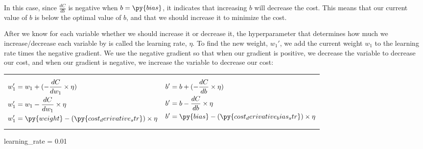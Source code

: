 \documentclass[12pt]{article}
\begin{document}
In this case, since $\frac{dC}{db}$ is negative when $b = \py{bias}$, it indicates that increasing $b$ will decrease the cost. This means that our current value of $b$ is below the optimal value of $b$, and that we should increase it to minimize the cost.

After we know for each variable whether we should increase it or decrease it, the hyperparameter that determines how much we increase/decrease each variable by is called the learning rate, $\eta$. To find the new weight, $w_1'$, we add the current weight $w_1$ to the learning rate times the negative gradient. We use the negative gradient so that when our gradient is positive, we decrease the variable to decrease our cost, and when our gradient is negative, we increase the variable to decrease our cost:
{
\setlength{\abovedisplayskip}{0pt}
\setlength{\belowdisplayskip}{0pt}
\begin{center}
	\noindent\begin{tabularx}{0.8\linewidth}{X X}
		\vbox{
			\begin{align*}
				w_1' & = w_1 + (-\frac{dC}{dw_1} \times \eta)
				\\
				w_1' & = w_1 - \frac{dC}{dw_1} \times \eta
				\\
				w_1' & = \py{weight} - (\py{cost_derivative_str}) \times \eta
			\end{align*}
		}
		 &
		\vbox{
			\begin{align*}
				b' & = b + (-\frac{dC}{db} \times \eta)
				\\
				b' & = b - \frac{dC}{db} \times \eta
				\\
				b' & = \py{bias} - (\py{cost_derivative_bias_str}) \times \eta
			\end{align*}
		}
	\end{tabularx}
\end{center}
}

\begin{pycode}
learning_rate = 0.01
\end{pycode}
\end{document}
